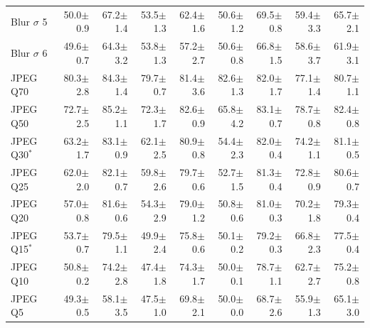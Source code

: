 \begin{table}[H]
\begin{tabular}{lrrrrrrrr}
Blur $\sigma$ 5 & 50.0{\scriptsize$\pm$0.9} & 67.2{\scriptsize$\pm$1.4} & 53.5{\scriptsize$\pm$1.3} & 62.4{\scriptsize$\pm$1.6} & 50.6{\scriptsize$\pm$1.2} & 69.5{\scriptsize$\pm$0.8} & 59.4{\scriptsize$\pm$3.3} & 65.7{\scriptsize$\pm$2.1} \\
Blur $\sigma$ 6 & 49.6{\scriptsize$\pm$0.7} & 64.3{\scriptsize$\pm$3.2} & 53.8{\scriptsize$\pm$1.3} & 57.2{\scriptsize$\pm$2.7} & 50.6{\scriptsize$\pm$0.8} & 66.8{\scriptsize$\pm$1.5} & 58.6{\scriptsize$\pm$3.7} & 61.9{\scriptsize$\pm$3.1} \\
\addlinespace
JPEG Q70 & 80.3{\scriptsize$\pm$2.8} & 84.3{\scriptsize$\pm$1.4} & 79.7{\scriptsize$\pm$0.7} & 81.4{\scriptsize$\pm$3.6} & 82.6{\scriptsize$\pm$1.3} & 82.0{\scriptsize$\pm$1.7} & 77.1{\scriptsize$\pm$1.4} & 80.7{\scriptsize$\pm$1.1} \\
JPEG Q50 & 72.7{\scriptsize$\pm$2.5} & 85.2{\scriptsize$\pm$1.1} & 72.3{\scriptsize$\pm$1.7} & 82.6{\scriptsize$\pm$0.9} & 65.8{\scriptsize$\pm$4.2} & 83.1{\scriptsize$\pm$0.7} & 78.7{\scriptsize$\pm$0.8} & 82.4{\scriptsize$\pm$0.8} \\
JPEG Q30$^{*}$ & 63.2{\scriptsize$\pm$1.7} & 83.1{\scriptsize$\pm$0.9} & 62.1{\scriptsize$\pm$2.5} & 80.9{\scriptsize$\pm$0.8} & 54.4{\scriptsize$\pm$2.3} & 82.0{\scriptsize$\pm$0.4} & 74.2{\scriptsize$\pm$1.1} & 81.1{\scriptsize$\pm$0.5} \\
JPEG Q25 & 62.0{\scriptsize$\pm$2.0} & 82.1{\scriptsize$\pm$0.7} & 59.8{\scriptsize$\pm$2.6} & 79.7{\scriptsize$\pm$0.6} & 52.7{\scriptsize$\pm$1.5} & 81.3{\scriptsize$\pm$0.4} & 72.8{\scriptsize$\pm$0.9} & 80.6{\scriptsize$\pm$0.7} \\
JPEG Q20 & 57.0{\scriptsize$\pm$0.8} & 81.6{\scriptsize$\pm$0.6} & 54.3{\scriptsize$\pm$2.9} & 79.0{\scriptsize$\pm$1.2} & 50.8{\scriptsize$\pm$0.6} & 81.0{\scriptsize$\pm$0.3} & 70.2{\scriptsize$\pm$1.8} & 79.3{\scriptsize$\pm$0.4} \\
JPEG Q15$^{*}$ & 53.7{\scriptsize$\pm$0.7} & 79.5{\scriptsize$\pm$1.1} & 49.9{\scriptsize$\pm$2.4} & 75.8{\scriptsize$\pm$0.6} & 50.1{\scriptsize$\pm$0.2} & 79.2{\scriptsize$\pm$0.3} & 66.8{\scriptsize$\pm$2.3} & 77.5{\scriptsize$\pm$0.4} \\
JPEG Q10 & 50.8{\scriptsize$\pm$0.2} & 74.2{\scriptsize$\pm$2.8} & 47.4{\scriptsize$\pm$1.8} & 74.3{\scriptsize$\pm$1.7} & 50.0{\scriptsize$\pm$0.1} & 78.7{\scriptsize$\pm$1.1} & 62.7{\scriptsize$\pm$2.7} & 75.2{\scriptsize$\pm$0.8} \\
JPEG Q5 & 49.3{\scriptsize$\pm$0.5} & 58.1{\scriptsize$\pm$3.5} & 47.5{\scriptsize$\pm$1.0} & 69.8{\scriptsize$\pm$2.1} & 50.0{\scriptsize$\pm$0.0} & 68.7{\scriptsize$\pm$2.6} & 55.9{\scriptsize$\pm$1.3} & 65.1{\scriptsize$\pm$3.0} \\

\end{tabular}
\end{table}
